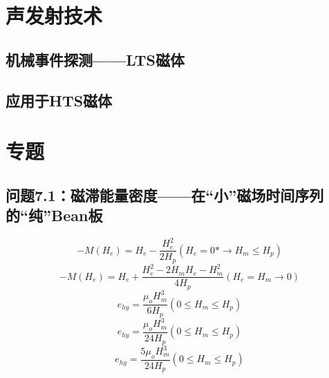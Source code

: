 \section{声发射技术}
\subsection{机械事件探测——LTS磁体}

\subsection{应用于HTS磁体}




\section{专题}
\subsection{问题7.1：磁滞能量密度——在“小”磁场时间序列的“纯”Bean板}

\begin{equation}%
-M(H_e)=H_e-\frac{H_{e}^{2}}{2H_p}        (H_e=0*\rightarrow H_m\leq H_p)
\end{equation}
\begin{equation}%
-M(H_e)=H_e+\frac{H_{e}^{2}-2H_mH_e-H_{m}^{2}}{4H_p}      (H_e=H_m\rightarrow 0)
\end{equation}
\begin{equation}%
e_{hy}=\frac{\mu_oH_{m}^{3}}{6H_p}        (0\leq H_m\leq H_p)
\end{equation}
\begin{equation}%
e_{hy}=\frac{\mu_oH_{m}^{3}}{24H_p}       (0\leq H_m\leq H_p)
\end{equation}
\begin{equation}%
e_{hy}=\frac{5\mu_oH_{m}^{3}}{24H_p}      (0\leq H_m\leq H_p)
\end{equation}


